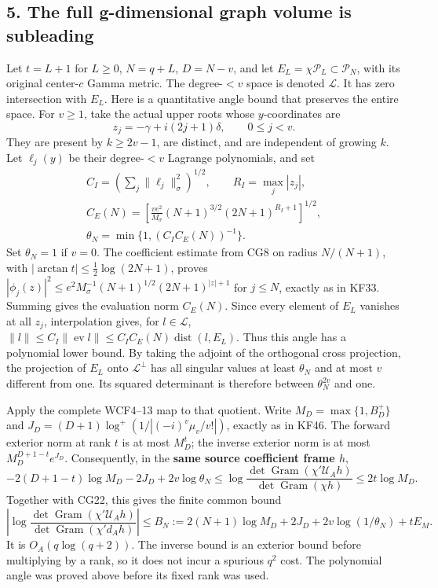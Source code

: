 \documentclass[11pt]{article}
\begin{document}
\subsection{5. The full g-dimensional graph volume is subleading}\label{the-full-g-dimensional-graph-volume-is-subleading}

Let \(t=L+1\) for \(L\ge0\), \(N=q+L\), \(D=N-v\), and let \(E_L=\chi\mathcal P_L\subset\mathcal P_N\), with its original center-\(c\) Gamma metric. The degree-\(<v\) space is denoted \(\mathcal L\). It has zero intersection with \(E_L\). Here is a quantitative angle bound that preserves the entire space. For \(v\ge1\), take the actual upper roots whose \(y\)-coordinates are \[
z_j=-\gamma+i(2j+1)\delta,\qquad0\le j<v.
\] They are present by \(k\ge2v-1\), are distinct, and are independent of growing \(k\). Let \(\ell_j(y)\) be their degree-\(<v\) Lagrange polynomials, and set \[
\begin{gathered} C_I=\left(\sum_j\|\ell_j\|_\sigma^2\right)^{1/2},\qquad R_I=\max_j|z_j|,\\
C_E(N)=\left[\frac{ve^2}{M_\sigma}(N+1)^{3/2}
 (2N+1)^{R_I+1}\right]^{1/2},\\
\theta_N=\min\{1,(C_IC_E(N))^{-1}\}.\end{gathered}
\tag{CG23}
\] Set \(\theta_N=1\) if \(v=0\). The coefficient estimate from CG8 on radius \(N/(N+1)\), with \(|\arctan t|\le\tfrac12\log(2N+1)\), proves \(|\phi_j(z)|^2\le e^2M_\sigma^{-1}(N+1)^{1/2}
 (2N+1)^{|z|+1}\) for \(j\le N\), exactly as in KF33. Summing gives the evaluation norm \(C_E(N)\). Since every element of \(E_L\) vanishes at all \(z_j\), interpolation gives, for \(l\in\mathcal L\), \(\|l\|\le C_I\|\operatorname{ev}l\|
\le C_IC_E(N)\operatorname{dist}(l,E_L)\). Thus this angle has a polynomial lower bound. By taking the adjoint of the orthogonal cross projection, the projection of \(E_L\) onto \(\mathcal L^\perp\) has all singular values at least \(\theta_N\) and at most \(v\) different from one. Its squared determinant is therefore between \(\theta_N^{2v}\) and one.

Apply the complete WCF4--13 map to that quotient. Write \(M_D=\max\{1,B_D^+\}\) and \(J_D=(D+1)\log^+(1/|(-i)^v\mu_v/v!|)\), exactly as in KF46. The forward exterior norm at rank \(t\) is at most \(M_D^t\); the inverse exterior norm is at most \(M_D^{D+1-t}e^{J_D}\). Consequently, in the \textbf{same source coefficient frame \(h\)}, \[
-2(D+1-t)\log M_D-2J_D+2v\log\theta_N
\le\log\frac{\det\operatorname{Gram}(\chi'\mathcal U_Ah)}
{\det\operatorname{Gram}(\chi h)}
\le2t\log M_D.
\] Together with CG22, this gives the finite common bound \[
\left|\log\frac{\det\operatorname{Gram}(\chi'\mathcal U_Ah)}
{\det\operatorname{Gram}(\chi'd_Ah)}\right|
\le B_N:=2(N+1)\log M_D+2J_D+2v\log(1/\theta_N)+tE_M.
\] It is \(O_A(q\log(q+2))\). The inverse bound is an exterior bound before multiplying by a rank, so it does not incur a spurious \(q^2\) cost. The polynomial angle was proved above before its fixed rank was used.
\end{document}
